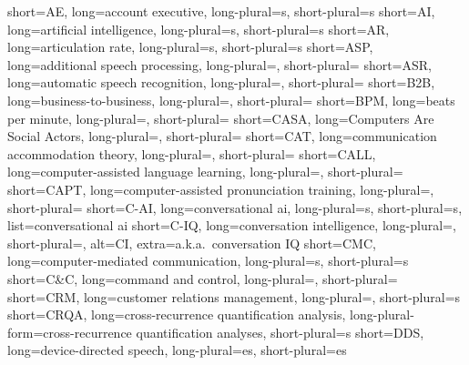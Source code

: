 
		{short=AE,		long=account executive,								long-plural=s, short-plural=s}
		{short=AI,		long=artificial intelligence,						long-plural=s, short-plural=s}
		{short=AR,		long=articulation rate,								long-plural=s, short-plural=s}
	{short=ASP,		long=additional speech processing,  				long-plural=, short-plural=}
	{short=ASR, 	long=automatic speech recognition, 					long-plural=, short-plural=}
	{short=B2B, 	long=business-to-business,							long-plural=, short-plural=}
	{short=BPM, 	long=beats per minute, 								long-plural=, short-plural=}
	{short=CASA, 	long=Computers Are Social Actors, 					long-plural=, short-plural=}
	{short=CAT, 	long=communication accommodation theory, 			long-plural=, short-plural=}
	{short=CALL, 	long=computer-assisted language learning, 			long-plural=, short-plural=}
	{short=CAPT, 	long=computer-assisted pronunciation training, 		long-plural=, short-plural=}
	{short=C-AI, 	long=conversational \acs*{ai},						long-plural=s, short-plural=s, list=conversational \acs*{ai}}
	{short=C-IQ,	long=conversation intelligence, 					long-plural=, short-plural=, alt=CI, extra=a.k.a.\ conversation IQ}
	{short=CMC, 	long=computer-mediated communication, 				long-plural=s, short-plural=s}
	{short=C\&C, 	long=command and control, 							long-plural=, short-plural=}
	{short=CRM, 	long=customer relations management,					long-plural=, short-plural=s}
	{short=CRQA, 	long=cross-recurrence quantification analysis,		long-plural-form=cross-recurrence quantification analyses, short-plural=s}
	{short=DDS, 	long=device-directed speech, 						long-plural=es, short-plural=es}
